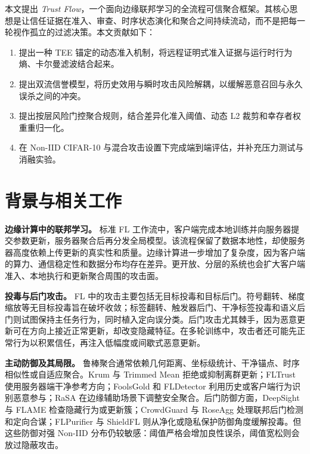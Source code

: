 \documentclass[10pt,a4paper,UTF8,fontset=fandol]{ctexart}
\newenvironment{tightenumerate}{%
  \begin{enumerate}\setlength{\itemsep}{1pt}\setlength{\parskip}{0pt}\setlength{\parsep}{0pt}}{\end{enumerate}}
\begin{document}
本文提出 \emph{Trust Flow}，一个面向边缘联邦学习的全流程可信聚合框架。其核心思想是让信任证据在准入、审查、时序状态演化和聚合之间持续流动，而不是把每一轮视作孤立的过滤决策。本文贡献如下：
\begin{tightenumerate}
    \item 提出一种 TEE 锚定的动态准入机制，将远程证明式准入证据与运行时行为熵、卡尔曼滤波结合起来。
    \item 提出双流信誉模型，将历史效用与瞬时攻击风险解耦，以缓解恶意召回与永久误杀之间的冲突。
    \item 提出按层风险门控聚合规则，结合差异化准入阈值、动态 L2 裁剪和幸存者权重重归一化。
    \item 在 Non-IID CIFAR-10 与混合攻击设置下完成端到端评估，并补充压力测试与消融实验。
\end{tightenumerate}

\section{背景与相关工作}

\textbf{边缘计算中的联邦学习。} 标准 FL 工作流中，客户端完成本地训练并向服务器提交参数更新，服务器聚合后再分发全局模型。该流程保留了数据本地性，却使服务器高度依赖上传更新的真实性和质量。边缘计算进一步增加了复杂度，因为客户端的算力、通信稳定性和数据分布均存在差异。更开放、分层的系统也会扩大客户端准入、本地执行和更新聚合周围的攻击面。

\textbf{投毒与后门攻击。} FL 中的攻击主要包括无目标投毒和目标后门。符号翻转、梯度缩放等无目标投毒旨在破坏收敛；标签翻转、触发器后门、干净标签投毒和语义后门则试图保持主任务行为，同时植入定向误分类。后门攻击尤其棘手，因为恶意更新可在方向上接近正常更新，却改变隐藏特征\cite{bagdasaryan2020backdoor,wang2019neuralcleanse}。在多轮训练中，攻击者还可能先正常行为以积累信任，再注入低幅度或间歇式恶意更新。

\textbf{主动防御及其局限。} 鲁棒聚合通常依赖几何距离、坐标级统计、干净锚点、时序相似性或自适应聚合。Krum 与 Trimmed Mean 拒绝或抑制离群更新\cite{blanchard2017krum,yin2018byzantine}；FLTrust 使用服务器端干净参考方向\cite{cao2021fltrust}；FoolsGold 和 FLDetector 利用历史或客户端行为识别恶意参与\cite{fung2020foolsgold,fldetector2022}；RaSA 在边缘辅助场景下调整安全聚合\cite{wang2025rasa}。后门防御方面，DeepSight 与 FLAME 检查隐藏行为或更新簇\cite{deepsight2022,flame2022}；CrowdGuard 与 RoseAgg 处理联邦后门检测和定向合谋\cite{crowdguard2024,roseagg}；FLPurifier 与 ShieldFL 则从净化或隐私保护防御角度缓解投毒\cite{flpurifier,shieldfl}。但这些防御对强 Non-IID 分布仍较敏感：阈值严格会增加良性误杀，阈值宽松则会放过隐蔽攻击。
\end{document}
